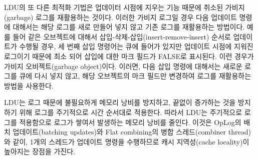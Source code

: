 LDU의 또 다른 최적화 기법은 업데이터 시점에 지우는 기능 때문에 취소된 가비지(garbage) 로그를
재활용하는 것이다.
이러한 가비지 로그일 경우 다음 업데이트 명령에 대해서는 해당 로그를 새로 만들어 넣지 않고 기존 로그를
재활용하는 방법이다.
예를 들어 같은 오브젝트에 대해서 삽입-삭제-삽입(insert-remove-insert) 순서로 업데이트가 수행될 경우, 세 번째
삽입 명령어는 큐에 들어가 있지만 업데이트 시점에 지워진 로그이기 때문에 최소 되어 삽입에 대한 마크 필드가
FALSE로 표시된다. 이런 경우가 가비지 오비젝트(garbage object)이다.
이러면, 다음 삽입 명령에 대해서는 새로운 로그를 큐에 다시 넣지 않고, 해당 오브젝트의 마크 필드만
 변경하여 로그를 재활용하는 방법을 사용한다.

LDU는 로그 때문에 불필요하게 메모리 낭비를 방지하고, 끝없이 증가하는 것을 방지하기 위해 
로그를 주기적으로 시간 순서대로 적용한다. 
따라서 LDU는 주기적으로 로그를 적용함으로 로그가 쌓여서 발생하는 메모리 낭비를 줄인다. 
이것은 OpLog의 배치 업데이트(batching updates)와 Flat combining의 병합 스레드(combiner thread)와
같이, 1개의 스레드가 업데이트 명령을 수행하므로 캐시 지역성(cache locality)이 높아지는 장점을 가진다. 


